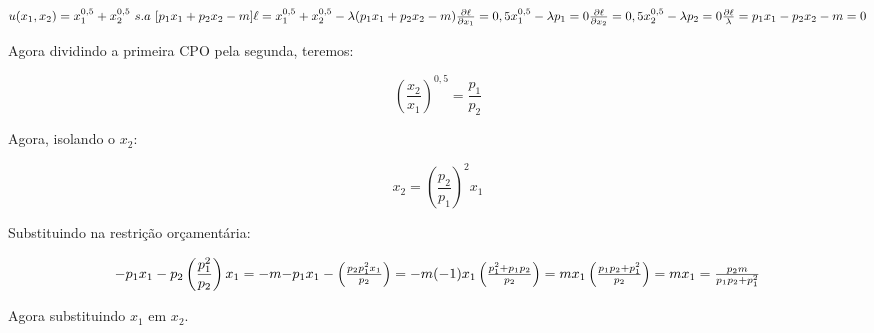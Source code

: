\begin{flushleft}
\begin{equation}
	u(x_{1},x_{2}) = x_{1}^{0,5} + x_{2}^{0,5}  \ s.a \ [p_{1}x_{1} + p_{2}x_{2} - m] $$\\$$
	\ell = x_{1}^{0,5} + x_{2}^{0,5} - \lambda (p_{1}x_{1} + p_{2}x_{2} - m) $$\\$$
	\frac{\partial\ell}{\partial x_{1}} = 0,5x_{1}^{0,5} - \lambda p_{1} = 0
	$$\\$$
	\frac{\partial\ell}{\partial x_{2}} = 0,5x_{2}^{0,5} - \lambda p_{2} = 0
	$$\\$$
	\frac{\partial\ell}{\lambda} = p_{1}x_{1} - p_{2}x_{2} - m = 0
\end{equation}
\singlespacing
\begin{center}
	
Agora dividindo a primeira CPO pela segunda, teremos:
\end{center}

\begin{equation}
	\left( \frac{x_{2}}{x_{1}} \right)^{0,5} = \frac{p_{1}}{p_{2}}
\end{equation}

\begin{center}
	Agora, isolando o $x_{2}$:

\end{center}

\begin{equation}
	x_{2} = \left( \frac{p_{2}}{p_{1}} \right)^{2}x_{1}
\end{equation}

\begin{center}
	Substituindo na restrição orçamentária:
\end{center}

\begin{equation}
	-p_{1}x_{1} - p_{2} \left( \frac{p_{1}^{2}}{p_{2}}\right)x_{1} = -m
	$$\\$$
	-p_{1}x_{1} - \left( \frac{p_{2}p_{1}^{2}x_{1}}{p_{2}} \right) = -m (-1)
	$$\\$$
	x_{1}\left( \frac{p_{1}^{2} + p_{1}p_{2}}{p_{2}} \right) = m
	$$\\$$
	x_{1}\left(\frac{p_{1}p_{2} + p_{1}^{2}}{p_{2}}\right) = m
	$$\\$$
	x_{1} = \frac{p_{2}m}{p_{1}p_{2} + p_{1}^{2}}
\end{equation}

\begin{center}
	Agora substituindo $x_{1}$ em $x_{2}$.
\end{center}


\end{flushleft}
